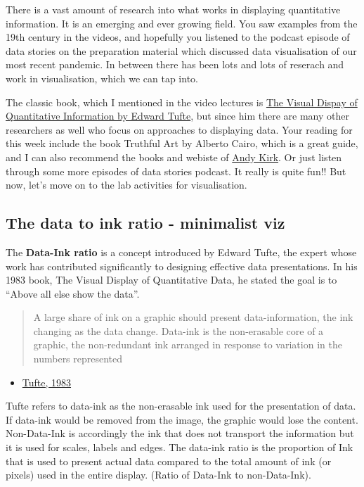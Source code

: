 \documentclass[
]{book}
\providecommand{\tightlist}{%
  \setlength{\itemsep}{0pt}\setlength{\parskip}{0pt}}
\begin{document}
There is a vast amount of research into what works in displaying quantitative information. It is an emerging and ever growing field. You saw examples from the 19th century in the videos, and hopefully you listened to the podcast episode of data stories on the preparation material which discussed data visualisation of our most recent pandemic. In between there has been lots and lots of reserach and work in visualisation, which we can tap into.

The classic book, which I mentioned in the video lectures is \href{https://www.edwardtufte.com/tufte/books_vdqi}{The Visual Dispay of Quantitative Information by Edward Tufte}, but since him there are many other researchers as well who focus on approaches to displaying data. Your reading for this week include the book Truthful Art by Alberto Cairo, which is a great guide, and I can also recommend the books and webiste of \href{https://www.visualisingdata.com/}{Andy Kirk}. Or just listen through some more episodes of data stories podcast. It really is quite fun!! But now, let's move on to the lab activities for visualisation.

\hypertarget{the-data-to-ink-ratio---minimalist-viz}{%
\subsection{The data to ink ratio - minimalist viz}\label{the-data-to-ink-ratio---minimalist-viz}}

The \textbf{Data-Ink ratio} is a concept introduced by Edward Tufte, the expert whose work has contributed significantly to designing effective data presentations. In his 1983 book, The Visual Display of Quantitative Data, he stated the goal is to ``Above all else show the data''.

\begin{quote}
A large share of ink on a graphic should present data-information, the ink changing as the data change. Data-ink is the non-erasable core of a graphic, the non-redundant ink arranged in response to variation in the numbers represented
\end{quote}

\begin{itemize}
\tightlist
\item
  \href{https://www.edwardtufte.com/tufte/books_vdqi}{Tufte, 1983}
\end{itemize}

Tufte refers to data-ink as the non-erasable ink used for the presentation of data. If data-ink would be removed from the image, the graphic would lose the content. Non-Data-Ink is accordingly the ink that does not transport the information but it is used for scales, labels and edges. The data-ink ratio is the proportion of Ink that is used to present actual data compared to the total amount of ink (or pixels) used in the entire display. (Ratio of Data-Ink to non-Data-Ink).
\end{document}
